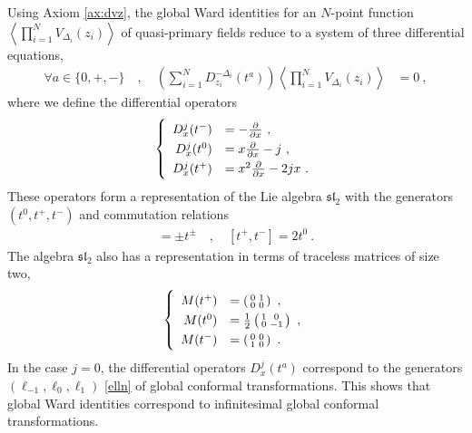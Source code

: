 \documentclass[12pt, a4paper, notitlepage, twoside]{report}
\numberwithin{equation}{section}
\theoremstyle{break}
\begin{document}
Using Axiom \ref{ax:dvz}, the global Ward identities for an $N$-point function $\left\langle \prod_{i=1}^N V_{\Delta_i}(z_i)\right\rangle$ of quasi-primary fields reduce to a system of three differential equations, 
\begin{align}
\forall a \in \{0,+,-\}\quad , \quad 
 \left(\sum_{i=1}^N D_{z_i}^{-\Delta_i}(t^a)\right) \left\langle \prod_{i=1}^N V_{\Delta_i}(z_i)\right\rangle & = 0\ ,
\label{spz}
\end{align}
where we define the differential operators
\begin{align}
\renewcommand{\arraystretch}{1.3}
 \left\{ \begin{array}{rl} D_x^{j}(t^-) & = -{\frac{\partial}{\partial x}}\ ,
\\
D_x^{j}(t^0) &  = x{\frac{\partial}{\partial x}} -j\ ,
\\
D_x^{j}(t^+) & = x^2{\frac{\partial}{\partial x}} - 2j x \ .
\end{array}\right. 
\label{ddz}
\end{align}
These operators form a representation of the Lie algebra \textbf{\boldmath $\mathfrak{sl}_2$}  with the generators $(t^0,t^+,t^-)$ and commutation relations 
\begin{align}
 [t^0,t^\pm ] =\pm t^\pm \quad , \quad [t^+,t^-]=2t^0\ .
\label{ttpm}
\end{align}
The algebra $\mathfrak{sl}_2$ also has a representation in terms of traceless matrices of size two,
\begin{align}
\renewcommand{\arraystretch}{1.3}
\left\{ \begin{array}{rl}
 M(t^+)& = \left(\begin{smallmatrix} 0 & 1 \\ 0& 0 \end{smallmatrix} \right) \ , 
\\
 M(t^0) &= \frac12\left(\begin{smallmatrix} 1 & 0 \\ 0 & -1 \end{smallmatrix}\right)\ ,
\\
M(t^-) & = \left(\begin{smallmatrix} 0 & 0 \\ 1 & 0 \end{smallmatrix} \right) \ .
\end{array} \right.
\label{mta}
\end{align}
In the case $j=0$, the differential operators $D^j_x(t^a)$ correspond to the generators $(\ell_{-1},\ell_0,\ell_1)$ \eqref{elln} of global conformal transformations.
This shows that global Ward identities correspond to infinitesimal global conformal transformations.
\end{document}
